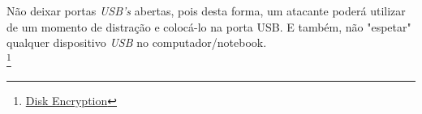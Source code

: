 \documentclass[12pt, letterpaper, Monospace:12]{report}
\begin{document}
	Não deixar portas \textit{USB's} abertas, pois desta forma, um atacante poderá utilizar de um momento de distração e colocá-lo na porta USB. E também, não "espetar" qualquer dispositivo \textit{USB} no computador/notebook.\\

\footnote{\href{https://wiki.archlinux.org/index.php/Disk_encryption}{Disk Encryption}}
\pagebreak
\end{document}
